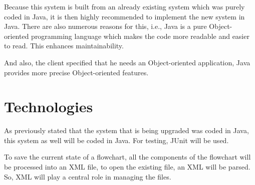 Because this system is built from an already existing system which was purely coded in Java, it is then highly recommended to implement the new system in Java. There are also numerous reasons for this, i.e., Java is a pure Object-oriented programming language which makes the code more readable and easier to read. This enhances maintainability.\newline

And also, the client specified that he needs an Object-oriented application, Java provides more precise Object-oriented features.

\section{Technologies}

As previously stated that the system that is being upgraded was coded in Java, this system as well will be coded in Java.
For testing, JUnit will be used. \newline

To save the current state of a flowchart, all the components of the flowchart will be processed into an XML file, to open the existing file, an XML will be parsed. So, XML will play a central role in managing the files.




%


